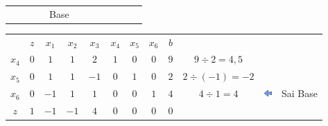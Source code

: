\begin{frame}
{\begin{table}
\begin{tabular}{c c c c c c c c c c c c}
				& 
				&  
				& 
				& \scriptsize Base
				& 
				& 
				&  
				&  
				& & & \\
			\end{tabular}
		\end{table}
	}
	{
		\begin{table}
			\begin{tabular}{c c c c c c c c c c c c}
				& \cellcolor{blue!80} \color{white} $ \scriptstyle z$
				& \cellcolor{blue!80} \color{white} $ \scriptstyle x_1$ 
				& \cellcolor{blue!80} \color{white} $ \scriptstyle x_2$
				& \cellcolor{blue!80} \color{white} $ \scriptstyle x_3$
				& \cellcolor{blue!80} \color{red} $ \scriptstyle x_4$
				& \cellcolor{blue!80} \color{red} $ \scriptstyle x_5$
				& \cellcolor{blue!80} \color{red} $ \scriptstyle x_6$ 
				& \cellcolor{blue!80} \color{white} $ \scriptstyle b$ 
				& & & \\
				\cellcolor{blue!80} \color{red} $ \scriptstyle x_4$
				& \cellcolor{yellow!60}  $ \scriptstyle 0$
				& \cellcolor{yellow!60}  $ \scriptstyle 1$ 
				& \cellcolor{yellow!60}  $ \scriptstyle 1$
				& \cellcolor{gray!60}  $ \scriptstyle 2$
				& \cellcolor{yellow!60}  $ \scriptstyle 1$
				& \cellcolor{yellow!60}  $ \scriptstyle 0$
				& \cellcolor{yellow!60}  $ \scriptstyle 0$ 
				& \cellcolor{gray!60}  $ \scriptstyle 9$ 
				& $ \scriptstyle 9 \div 2 = 4,5 $ &  & \\ 
				\cellcolor{blue!80} \color{red} $ \scriptstyle x_5$  
				& \cellcolor{yellow!60}  $ \scriptstyle 0$
				& \cellcolor{yellow!60}  $ \scriptstyle 1$ 
				& \cellcolor{yellow!60}  $ \scriptstyle 1$
				& \cellcolor{gray!60}  $ \scriptstyle -1$
				& \cellcolor{yellow!60}  $ \scriptstyle 0$
				& \cellcolor{yellow!60}  $ \scriptstyle 1$
				& \cellcolor{yellow!60}  $ \scriptstyle 0$ 
				& \cellcolor{gray!60}  $ \scriptstyle 2$
				& $ \scriptstyle 2 \div (-1) = -2 $ & & \\
				\cellcolor{blue!80} \color{red} $ \scriptstyle x_6$
				& \cellcolor{gray!60}  $ \scriptstyle 0$
				& \cellcolor{gray!60}  $ \scriptstyle -1$ 
				& \cellcolor{gray!60}  $ \scriptstyle 1$
				& \cellcolor{red!70}  $ \scriptstyle 1$
				& \cellcolor{gray!60}  $ \scriptstyle 0$
				& \cellcolor{gray!60}  $ \scriptstyle 0$
				& \cellcolor{gray!60}  $ \scriptstyle 1$ 
				& \cellcolor{gray!60}  $ \scriptstyle 4$ 
				& $ \scriptstyle 4 \div 1 = 4 $
				& \includegraphics[width=0.3cm,height=0.3cm]{setaesquerda.jpg} 
				& \scriptsize Sai Base\\
				\cellcolor{blue!80} \color{white} $ \scriptstyle z$
				& \cellcolor{yellow!60}  $ \scriptstyle 1$
				& \cellcolor{yellow!60}  $ \scriptstyle -1$ 
				& \cellcolor{yellow!60}  $ \scriptstyle -1$
				& \cellcolor{gray!60}  $ \scriptstyle 4$
				& \cellcolor{yellow!60}  $ \scriptstyle 0$
				& \cellcolor{yellow!60}  $ \scriptstyle 0$
				& \cellcolor{yellow!60}  $ \scriptstyle 0$ 
				& \cellcolor{gray!60}  $ \scriptstyle 0$ 
				& & & \\
				

\end{tabular}
\end{table}}
\end{frame}
